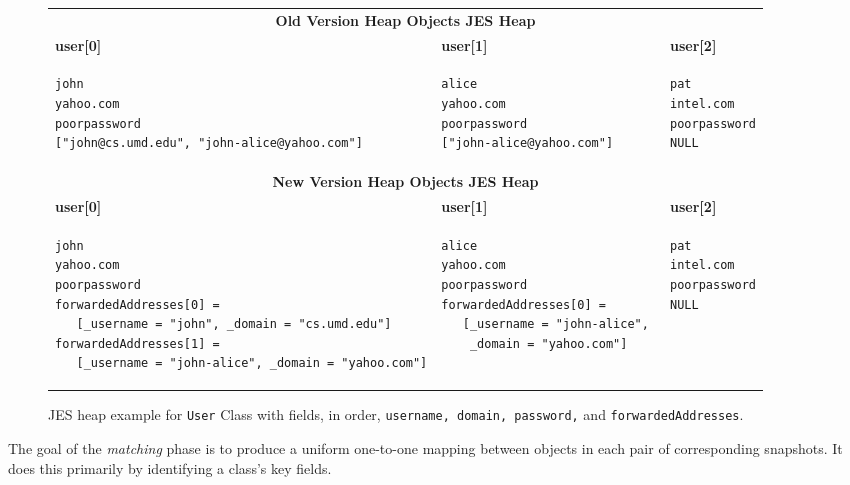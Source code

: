 \documentclass[natbib,10pt]{sigplanconf}
\newcommand{\code}[1]{\lstinline|#1|\xspace}
\begin{document}
\begin{figure}[t]
\begin{center}
\footnotesize{
\begin{tabular}{ p{2.7in} p{2in}  p{1.7in}} \\ \toprule
\multicolumn{3}{c}{\textsf{\textbf{Old Version Heap Objects JES Heap}}}\\
\textsf{\textbf{user[0]}} & \textsf{\textbf{user[1]}} & \textsf{\textbf{user[2]}} \\[-1.75em]
\begin{lstlisting}
john
yahoo.com
poorpassword
["john@cs.umd.edu", "john-alice@yahoo.com"]
\end{lstlisting}
& 
\begin{lstlisting}
alice
yahoo.com
poorpassword
["john-alice@yahoo.com"]
\end{lstlisting}
&
\begin{lstlisting}
pat
intel.com
poorpassword
NULL
\end{lstlisting} \\[-1.5em] \midrule
\multicolumn{3}{c}{\textsf{\textbf{New Version Heap Objects JES Heap}}}\\
\textsf{\textbf{user[0]}} & \textsf{\textbf{user[1]}} & \textsf{\textbf{user[2]}} \\[-1.75em]
\begin{lstlisting}
john
yahoo.com
poorpassword
forwardedAddresses[0] = 
   [_username = "john", _domain = "cs.umd.edu"]
forwardedAddresses[1] = 
   [_username = "john-alice", _domain = "yahoo.com"]
\end{lstlisting}
&
\begin{lstlisting}
alice
yahoo.com
poorpassword
forwardedAddresses[0] = 
   [_username = "john-alice", 
    _domain = "yahoo.com"]
\end{lstlisting}
&
\begin{lstlisting}
pat
intel.com
poorpassword
NULL
\end{lstlisting} \\[-3em]
\end{tabular}}
\end{center}
\caption{JES heap example for \code{User} Class with fields, in order, \code{username, domain, password,} and \code{forwardedAddresses}.}
\label{fig:JES-heap}
\end{figure}

The goal of the \emph{matching} phase is to produce a uniform
one-to-one mapping between objects in each pair of corresponding
snapshots.  It does this primarily by identifying a class's key
fields.  
\vspace*{1em}
\end{document}
